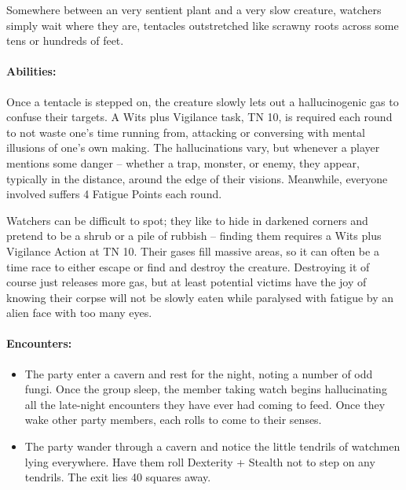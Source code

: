 \begin{multicols}{2}
\label{watcher}

Somewhere between an very sentient plant and a very slow creature, watchers simply wait where they are, tentacles outstretched like scrawny roots across some tens or hundreds of feet.


\paragraph{Abilities:} Once a tentacle is stepped on, the creature slowly lets out a hallucinogenic gas to confuse their targets.
A Wits plus Vigilance task, TN 10, is required each round to not waste one's time running from, attacking or conversing with mental illusions of one's own making.
The hallucinations vary, but whenever a player mentions some danger -- whether a trap, monster, or enemy, they appear, typically in the distance, around the edge of their visions.
Meanwhile, everyone involved suffers 4 Fatigue Points each round.

Watchers can be difficult to spot; they like to hide in darkened corners and pretend to be a shrub or a pile of rubbish -- finding them requires a Wits plus Vigilance Action at TN 10.
Their gases fill massive areas, so it can often be a time race to either escape or find and destroy the creature.
Destroying it of course just releases more gas, but at least potential victims have the joy of knowing their corpse will not be slowly eaten while paralysed with fatigue by an alien face with too many eyes.

\paragraph{Encounters:}

\begin{itemize}

  \item
  The party enter a cavern and rest for the night, noting a number of odd fungi.
  Once the group sleep, the member taking watch begins hallucinating all the late-night encounters they have ever had coming to feed.
  Once they wake other party members, each rolls to come to their senses.
  \item
  The party wander through a cavern and notice the little tendrils of watchmen lying everywhere.
  Have them roll Dexterity + Stealth not to step on any tendrils.
  The exit lies 40 squares away.

\end{itemize}

\watcher

\end{multicols}


